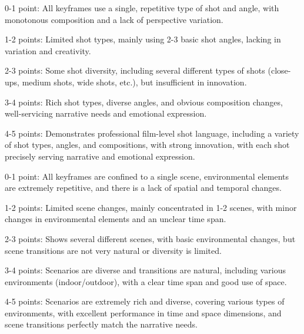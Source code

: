 \begin{prompt}[title={Shot Diversity}, label=ShotD]
0-1 point: All keyframes use a single, repetitive type of shot and angle, with monotonous composition and a lack of perspective variation.

1-2 points: Limited shot types, mainly using 2-3 basic shot angles, lacking in variation and creativity.

2-3 points: Some shot diversity, including several different types of shots (close-ups, medium shots, wide shots, etc.), but insufficient in innovation.

3-4 points: Rich shot types, diverse angles, and obvious composition changes, well-servicing narrative needs and emotional expression.

4-5 points: Demonstrates professional film-level shot language, including a variety of shot types, angles, and compositions, with strong innovation, with each shot precisely serving narrative and emotional expression.
\end{prompt}



\begin{prompt}[title={Scene Diversity}, label=SceneD]
0-1 point: All keyframes are confined to a single scene, environmental elements are extremely repetitive, and there is a lack of spatial and temporal changes.

1-2 points: Limited scene changes, mainly concentrated in 1-2 scenes, with minor changes in environmental elements and an unclear time span.

2-3 points: Shows several different scenes, with basic environmental changes, but scene transitions are not very natural or diversity is limited.

3-4 points: Scenarios are diverse and transitions are natural, including various environments (indoor/outdoor), with a clear time span and good use of space.

4-5 points: Scenarios are extremely rich and diverse, covering various types of environments, with excellent performance in time and space dimensions, and scene transitions perfectly match the narrative needs.
\end{prompt}

